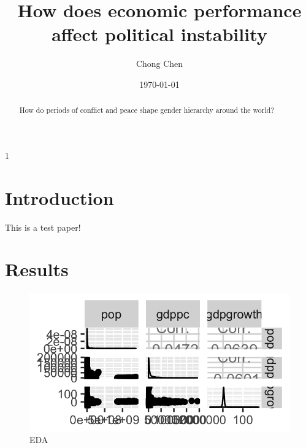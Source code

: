 \documentclass [12pt] {article}
\begin{document}
\renewcommand{\thefootnote}{\fnsymbol{footnote}}
\title{ \Large{How does economic performance affect political instability\vspace*{.2in}}}
\author{ Chong Chen\footnotemark[1]}
\date{\today}


\maketitle
\thispagestyle{empty}
\singlespacing
\renewcommand{\thefootnote}{\arabic{footnote}}

\renewcommand{\abstractname}{\large Abstract}
\begin{abstract}
  \bigskip
	\noindent
How do periods of conflict and peace shape gender hierarchy around the world? 
\end{abstract}



\newpage
\setlength{\parskip}{-2em}
\doublespacing
\setcounter{page} {1}

	
\section{Introduction}
\label{intro}
\vspace*{.2in}

This is a test paper!

\section{Results}
\label{result}
\vspace*{.2in}



\begin{figure}
\centering
\caption{EDA}
\label{eda}
\includegraphics[scale =.5]{images/eda.png}
\end{figure}
\end{document}
